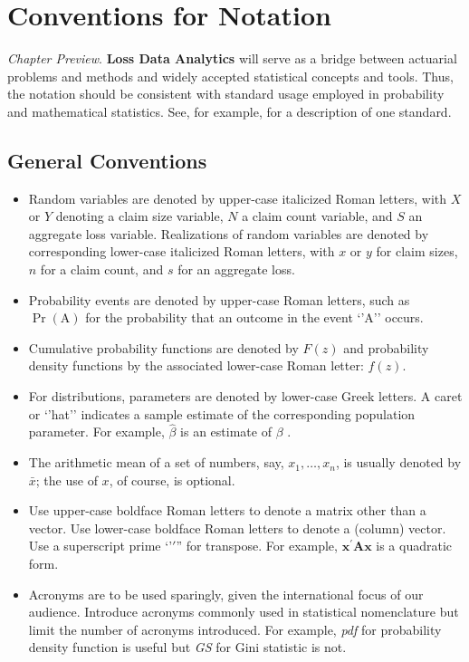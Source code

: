 \documentclass[]{book}
\providecommand{\tightlist}{%
  \setlength{\itemsep}{0pt}\setlength{\parskip}{0pt}}
\theoremstyle{definition}
\theoremstyle{definition}
\theoremstyle{definition}
\theoremstyle{remark}
\begin{document}
\chapter{Conventions for Notation}\label{S:NotationConvention}

\emph{Chapter Preview}. \textbf{Loss Data Analytics} will serve as a
bridge between actuarial problems and methods and widely accepted
statistical concepts and tools. Thus, the notation should be consistent
with standard usage employed in probability and mathematical statistics.
See, for example, \citep{halperin1965recommended} for a description of
one standard.

\section{General Conventions}\label{S:General}

\begin{itemize}
\tightlist
\item
  Random variables are denoted by upper-case italicized Roman letters,
  with \(X\) or \(Y\) denoting a claim size variable, \(N\) a claim
  count variable, and \(S\) an aggregate loss variable. Realizations of
  random variables are denoted by corresponding lower-case italicized
  Roman letters, with \(x\) or \(y\) for claim sizes, \(n\) for a claim
  count, and \(s\) for an aggregate loss.
\item
  Probability events are denoted by upper-case Roman letters, such as
  \(\Pr(\mathrm{A})\) for the probability that an outcome in the event
  `'A'' occurs.
\item
  Cumulative probability functions are denoted by \(F(z)\) and
  probability density functions by the associated lower-case Roman
  letter: \(f(z)\).
\item
  For distributions, parameters are denoted by lower-case Greek letters.
  A caret or `'hat'' indicates a sample estimate of the corresponding
  population parameter. For example, \(\hat{\beta}\) is an estimate of
  \(\beta\) .
\item
  The arithmetic mean of a set of numbers, say, \(x_1, \ldots, x_n\), is
  usually denoted by \(\bar{x}\); the use of \(x\), of course, is
  optional.
\item
  Use upper-case boldface Roman letters to denote a matrix other than a
  vector. Use lower-case boldface Roman letters to denote a (column)
  vector. Use a superscript prime `'\(\prime\)'' for transpose. For
  example, \(\mathbf{x}^{\prime} \mathbf{A} \mathbf{x}\) is a quadratic
  form.
\item
  Acronyms are to be used sparingly, given the international focus of
  our audience. Introduce acronyms commonly used in statistical
  nomenclature but limit the number of acronyms introduced. For example,
  \emph{pdf} for probability density function is useful but \emph{GS}
  for Gini statistic is not.
\end{itemize}
\end{document}
